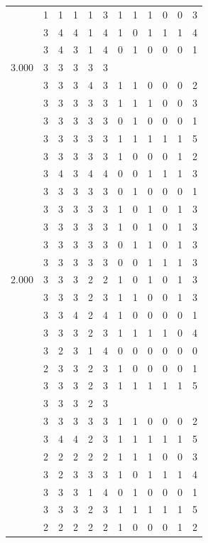\documentclass[]{msu-thesis}
\theoremstyle{definition}
\theoremstyle{definition}
\theoremstyle{definition}
\theoremstyle{remark}
\begin{document}
\begin{table}
{\begin{tabular}[t]{rrrrrrrrrrrr}
 & 1 & 1 & 1 & 1 & 3 & 1 & 1 & 1 & 0 & 0 & 3\\
 & 3 & 4 & 4 & 1 & 4 & 1 & 0 & 1 & 1 & 1 & 4\\
 & 3 & 4 & 3 & 1 & 4 & 0 & 1 & 0 & 0 & 0 & 1\\
3.000 & 3 & 3 & 3 & 3 & 3 &  &  &  &  &  & \\
 & 3 & 3 & 3 & 4 & 3 & 1 & 1 & 0 & 0 & 0 & 2\\
 & 3 & 3 & 3 & 3 & 3 & 1 & 1 & 1 & 0 & 0 & 3\\
 & 3 & 3 & 3 & 3 & 3 & 0 & 1 & 0 & 0 & 0 & 1\\
 & 3 & 3 & 3 & 3 & 3 & 1 & 1 & 1 & 1 & 1 & 5\\
 & 3 & 3 & 3 & 3 & 3 & 1 & 0 & 0 & 0 & 1 & 2\\
 & 3 & 4 & 3 & 4 & 4 & 0 & 0 & 1 & 1 & 1 & 3\\
 & 3 & 3 & 3 & 3 & 3 & 0 & 1 & 0 & 0 & 0 & 1\\
 & 3 & 3 & 3 & 3 & 3 & 1 & 0 & 1 & 0 & 1 & 3\\
 & 3 & 3 & 3 & 3 & 3 & 1 & 0 & 1 & 0 & 1 & 3\\
 & 3 & 3 & 3 & 3 & 3 & 0 & 1 & 1 & 0 & 1 & 3\\
 & 3 & 3 & 3 & 3 & 3 & 0 & 0 & 1 & 1 & 1 & 3\\
2.000 & 3 & 3 & 3 & 2 & 2 & 1 & 0 & 1 & 0 & 1 & 3\\
 & 3 & 3 & 3 & 2 & 3 & 1 & 1 & 0 & 0 & 1 & 3\\
 & 3 & 3 & 4 & 2 & 4 & 1 & 0 & 0 & 0 & 0 & 1\\
 & 3 & 3 & 3 & 2 & 3 & 1 & 1 & 1 & 1 & 0 & 4\\
 & 3 & 2 & 3 & 1 & 4 & 0 & 0 & 0 & 0 & 0 & 0\\
 & 2 & 3 & 3 & 2 & 3 & 1 & 0 & 0 & 0 & 0 & 1\\
 & 3 & 3 & 3 & 2 & 3 & 1 & 1 & 1 & 1 & 1 & 5\\
 & 3 & 3 & 3 & 2 & 3 &  &  &  &  &  & \\
 & 3 & 3 & 3 & 3 & 3 & 1 & 1 & 0 & 0 & 0 & 2\\
 & 3 & 4 & 4 & 2 & 3 & 1 & 1 & 1 & 1 & 1 & 5\\
 & 2 & 2 & 2 & 2 & 2 & 1 & 1 & 1 & 0 & 0 & 3\\
 & 3 & 2 & 3 & 3 & 3 & 1 & 0 & 1 & 1 & 1 & 4\\
 & 3 & 3 & 3 & 1 & 4 & 0 & 1 & 0 & 0 & 0 & 1\\
 & 3 & 3 & 3 & 2 & 3 & 1 & 1 & 1 & 1 & 1 & 5\\
 & 2 & 2 & 2 & 2 & 2 & 1 & 0 & 0 & 0 & 1 & 2\\

\end{tabular}}
\end{table}
\end{document}
